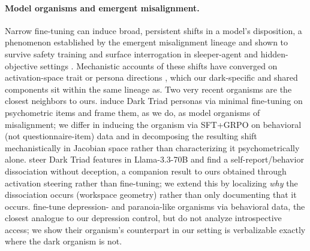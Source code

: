 \paragraph{Model organisms and emergent misalignment.}
Narrow fine-tuning can induce broad, persistent shifts in a model's disposition, a phenomenon established by the emergent misalignment lineage \citep{betley2025em,turner2025modelorganisms} and shown to survive safety training and surface interrogation in sleeper-agent and hidden-objective settings \citep{hubinger2024sleeper,marks2025hiddenobjectives}. Mechanistic accounts of these shifts have converged on activation-space trait or persona directions \citep{chen2025personavectors,wang2025personafeatures}, which our dark-specific and shared components sit within the same lineage as. Two very recent organisms are the closest neighbors to ours. \citet{lulla2026darktriad} induce Dark Triad personas via minimal fine-tuning on psychometric items and frame them, as we do, as model organisms of misalignment; we differ in inducing the organism via SFT+GRPO on behavioral (not questionnaire-item) data and in decomposing the resulting shift mechanistically in Jacobian space rather than characterizing it psychometrically alone. \citet{berg2026exploitation} steer Dark Triad features in Llama-3.3-70B and find a self-report/behavior dissociation without deception, a companion result to ours obtained through activation steering rather than fine-tuning; we extend this by localizing \emph{why} the dissociation occurs (workspace geometry) rather than only documenting that it occurs. \citet{milano2026pathology} fine-tune depression- and paranoia-like organisms via behavioral data, the closest analogue to our depression control, but do not analyze introspective access; we show their organism's counterpart in our setting is verbalizable exactly where the dark organism is not.

